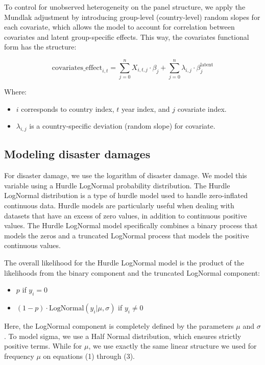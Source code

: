 To control for unobserved heterogeneity on the panel structure, we apply the Mundlak adjustment by introducing group-level (country-level) random slopes for each covariate, which allows the model to account for correlation between covariates and latent group-specific effects. This way, the covariates functional form has the structure:

\begin{equation}
\text{covariates\_effect}_{i,t} = \sum_{j=0}^{n} X_{i,t,j} \cdot \beta_j + \sum_{j=0}^{n} \lambda_{i,j} \cdot \beta_j^{\text{latent}}
\end{equation}

Where:
\begin{itemize}
    \item $i$ corresponds to country index, $t$ year index, and $j$ covariate index.
    \item $\lambda_{i,j}$ is a country-specific deviation (random slope) for covariate.
\end{itemize}

\subsection{Modeling disaster damages}

For disaster damage, we use the logarithm of disaster damage. We model this variable using a Hurdle LogNormal probability distribution. The Hurdle LogNormal distribution is a type of hurdle model used to handle zero-inflated continuous data. Hurdle models are particularly useful when dealing with datasets that have an excess of zero values, in addition to continuous positive values. The Hurdle LogNormal model specifically combines a binary process that models the zeros and a truncated LogNormal process that models the positive continuous values.

The overall likelihood for the Hurdle LogNormal model is the product of the likelihoods from the binary component and the truncated LogNormal component:

\begin{itemize}
    \item $p$ if $y_i = 0$
    \item $(1-p) \cdot \text{LogNormal}(y_i|\mu, \sigma)$ if $y_i \neq 0$
\end{itemize}

Here, the LogNormal component is completely defined by the parameters $\mu$ and $\sigma$. To model sigma, we use a Half Normal distribution, which ensures strictly positive terms. While for $\mu$, we use exactly the same linear structure we used for frequency $\mu$ on equations (1) through (3).


